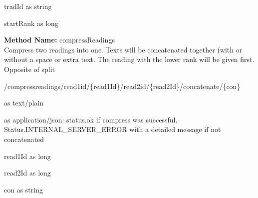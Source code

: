 \begin{parameter}
tradId as string
\end{parameter}
\begin{parameter}
startRank as long
\end{parameter}
\textbf{Method Name: }compressReadings \\ Compress two readings into one. Texts will be concatenated together (with or without a space or extra text. The reading with the lower rank will be given first. Opposite of split
\begin{post}
/compressreadings/read1id/\{read1Id\}/read2id/\{read2Id\}/concatenate/\{con\}
\end{post}
\begin{request}
 as text/plain
\end{request}
\begin{response}
 as application/json: status.ok if compress was successful. Status.INTERNAL\_SERVER\_ERROR with a detailed message if not concatenated
\end{response}
\begin{parameter}
read1Id as long
\end{parameter}
\begin{parameter}
read2Id as long
\end{parameter}
\begin{parameter}
con as string
\end{parameter}
